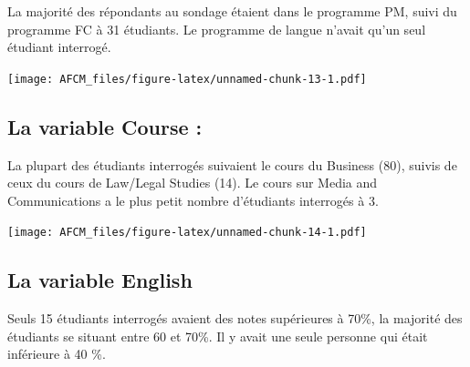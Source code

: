 \documentclass[
]{article}
\newenvironment{Shaded}{\begin{snugshade}}{\end{snugshade}}
\newcommand{\FunctionTok}[1]{\textcolor[rgb]{0.00,0.00,0.00}{#1}}
\newcommand{\NormalTok}[1]{#1}
\newcommand{\SpecialCharTok}[1]{\textcolor[rgb]{0.00,0.00,0.00}{#1}}
\newcommand{\StringTok}[1]{\textcolor[rgb]{0.31,0.60,0.02}{#1}}
\begin{document}
La majorité des répondants au sondage étaient dans le programme PM,
suivi du programme FC à 31 étudiants. Le programme de langue n'avait
qu'un seul étudiant interrogé.

\begin{Shaded}
\end{Shaded}

\texttt{[image: AFCM\_files/figure-latex/unnamed-chunk-13-1.pdf]}

\hypertarget{la-variable-course}{%
\subsection{La variable Course :}\label{la-variable-course}}

La plupart des étudiants interrogés suivaient le cours du Business (80),
suivis de ceux du cours de Law/Legal Studies (14). Le cours sur Media
and Communications a le plus petit nombre d'étudiants interrogés à 3.

\begin{Shaded}
\end{Shaded}

\texttt{[image: AFCM\_files/figure-latex/unnamed-chunk-14-1.pdf]}

\hypertarget{la-variable-english}{%
\subsection{La variable English}\label{la-variable-english}}

Seuls 15 étudiants interrogés avaient des notes supérieures à 70\%, la
majorité des étudiants se situant entre 60 et 70\%. Il y avait une seule
personne qui était inférieure à 40 \%.

\begin{Shaded}
\end{Shaded}
\end{document}
